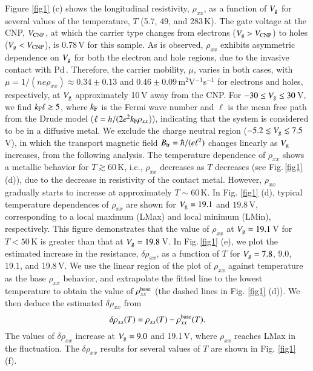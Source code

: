 \documentclass[final,5p,times,twocolumn]{elsarticle}
\begin{document}
Figure \ref{fig1} (c) shows the longitudinal resistivity, $\rho_{xx}$, as a function of $V_{\rm g}$ for several values of the temperature, $T$ (5.7, 49, and 283\,K).
The gate voltage at the CNP, $V_{\rm CNP}$, at which the carrier type changes from electrons ($V_{\rm g} > V_{\rm CNP}$) to holes ($V_{\rm g} < V_{\rm CNP}$), is 0.78\,V for this sample.
As is observed, $\rho_{xx}$ exhibits asymmetric dependence on $V_{\rm g}$ for both  the electron and hole regions, due to the invasive contact with Pd\,\cite{Huard}. Therefore, the carrier mobility, $\mu$, varies in both cases, with $\mu =1/(ne\rho_{xx}) \approx 0.34 \pm 0.13$ and $0.46 \pm 0.09 $\,m$^2$V$^{-1}$s$^{-1}$ for electrons and holes, respectively, at $V_{\rm g}$ approximately 10\,V away from the CNP.
For $-30 \leq V_{\rm g} \leq 30$\,V, we find $k_{\rm F} \ell \geq 5$, where $k_{\rm F}$ is the Fermi wave number and  $\ell$ is the mean free path from the Drude model ($\ell = h/(2e^2k_{\rm F}\rho_{xx}$)), indicating that the system is considered to be in a diffusive metal. 
We exclude the charge neutral region ($-5.2 \lesssim V_{\rm g} \lesssim 7.5$\,V), in which the transport magnetic field $B_{\rm tr}=\hbar/(e\ell^2)$ changes linearly as $V_{\rm g}$ increases, from the following analysis.
The temperature dependence of $\rho_{xx}$ shows a metallic behavior for $T \gtrsim 60$\,K, i.e., $\rho_{xx}$ decreases as $T$ decreases (see Fig.\,\ref{fig1} (d)), due to the decrease in resistivity of the contact metal.
However, $\rho_{xx}$ gradually starts to increase at approximately $T \sim 60$\,K.
In Fig. \ref{fig1} (d), typical temperature dependences of $\rho_{xx}$ are shown for $V_{\rm g} =19.1$ and $19.8$\,V, corresponding to a local maximum (LMax) and local minimum (LMin), respectively.
This figure demonstrates that the value of $\rho_{xx}$ at $V_{\rm g} = 19.1$\,V for $T < 50$\,K is greater than that at $V_{\rm g} =19.8$\,V.
In Fig.\,\ref{fig1} (e), we plot the estimated increase in the resistance, $\delta\rho_{xx}$, as a function of $T$ for $V_{\rm g} =7.8$, 9.0, 19.1, and 19.8\,V.
We use the linear region of the plot of $\rho_{xx}$ against temperature as the base $\rho_{xx}$ behavior, and extrapolate the fitted line to the lowest temperature to obtain the value of $\rho_{xx}^{\rm base}$  (the dashed lines in Fig. \ref{fig1} (d)). We then deduce the estimated $\delta\rho_{xx}$ from
\begin{equation}
\delta \rho_{xx}(T) = \rho_{xx}(T) - \rho_{xx}^{\rm base}(T).  \label{eq_drho}
\end{equation}
The  values of $\delta\rho_{xx}$ increase at $V_{\rm g}=9.0$ and 19.1\,V, where $\rho_{xx}$ reaches LMax in the fluctuation. 
The $\delta \rho_{xx}$ results for several values of $T$ are shown in Fig. \ref{fig1} (f).
\end{document}
